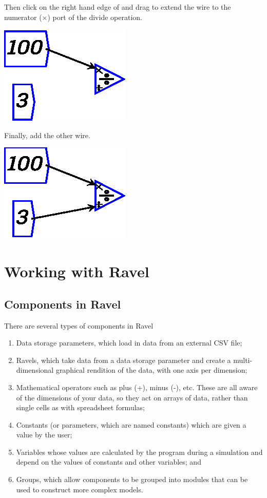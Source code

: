 Then click on the right hand edge of  and drag to extend the wire to the numerator ($\times$) port of the divide operation.

\begin{center}
\includegraphics{images/wireExample1.eps}
\end{center}

Finally, add the other wire.
\begin{center}
\includegraphics{images/wireExample2.eps}
\end{center}

\section{Working with Ravel}

\subsection{Components in Ravel}

There are several types of components in Ravel
\begin{enumerate}
\item Data storage parameters, which load in data from an external CSV file;
\item Ravels, which take data from a data storage parameter and create a multi-dimensional graphical rendition of the data, with one axis per dimension;
\item Mathematical operators such as plus (+), minus (-), etc. These are all aware of the dimensions of your data, so they act on arrays of data, rather than single cells as with spreadsheet formulas;
\item Constants (or parameters, which are named constants) which are given a value by the user;
\item Variables whose values are calculated by the program during a simulation and depend on the values of constants and other variables; and
\item Groups, which allow components to be grouped into modules that can be used to construct more complex models.
\end{enumerate}



